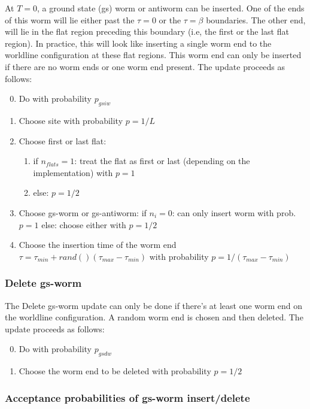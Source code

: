 \documentclass[12pt, two sided]{article}
\begin{document}
    At $T=0$, a ground state (gs) worm or antiworm can be inserted. One of the ends of this worm will lie either past the $\tau=0$ or the $\tau=\beta$ boundaries. The other end, will lie in the flat region preceding this boundary (i.e, the first or the last flat region). In practice, this will look like inserting a single worm end to the worldline configuration at these flat regions. This worm end can only be inserted if there are no worm ends or one worm end present. The update proceeds as
    follows:
    \begin{enumerate}
        \setcounter{enumi}{-1}
    \item Do with probability $p_{gsiw}$
    \item Choose site with probability $p=1/L$
    \item Choose first or last flat:
        \begin{enumerate}
            \item if $n_{flats} = 1$: treat the flat as first or last (depending on the implementation) with $p=1$
            \item else: $p=1/2$
        \end{enumerate}
    \item Choose gs-worm or gs-antiworm:
        if $n_i=0$: can only insert worm with prob. $p=1$ 
        else: choose either with $p=1/2$
    \item Choose the insertion time of the worm end $\tau = \tau_{min} + rand() (\tau_{max}-\tau_{min})$ with probability $p=1/(\tau_{max}-\tau_{min})$
    \end{enumerate}

    \subsubsection{Delete gs-worm}
    The Delete gs-worm update can only be done if there's at least one worm end on the worldline configuration. A random worm end is chosen and then deleted. The update proceeds as follows:
    \begin{enumerate}
        \setcounter{enumi}{-1}
    \item Do with probability $p_{gsdw}$
    \item Choose the worm end to be deleted with probability $p=1/2$
    \end{enumerate}

    \subsubsection{Acceptance probabilities of gs-worm insert/delete}
\end{document}
